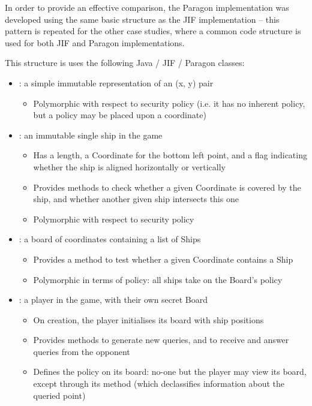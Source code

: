 In order to provide an effective comparison, the Paragon implementation was developed using the same basic structure as the JIF implementation -- this pattern is repeated for the other case studies, where a common code structure is used for both JIF and Paragon implementations.

This structure is uses the following Java / JIF / Paragon classes:

\begin{itemize}
	\item {}: a simple immutable representation of an (x, y) pair
	
	\begin{itemize}
		\item Polymorphic with respect to security policy (i.e. it has no inherent policy, but a policy may be placed upon a coordinate)
	\end{itemize}
	
	\item {}: an immutable single ship in the game
	
	\begin{itemize}
		\item Has a length, a Coordinate for the bottom left point, and a flag indicating whether the ship is aligned horizontally or vertically
		
		\item Provides methods to check whether a given Coordinate is covered by the ship, and whether another given ship intersects this one
		
		\item Polymorphic with respect to security policy
	\end{itemize}
	
	\item {}: a board of coordinates containing a list of Ships
	
	\begin{itemize}

		\item Provides a method to test whether a given Coordinate contains a Ship
		
		\item Polymorphic in terms of policy: all ships take on the Board's policy
	\end{itemize}
	
	\item {}: a player in the game, with their own secret Board
	
	\begin{itemize}
		\item On creation, the player initialises its board with ship positions
		\item Provides methods to generate new queries, and to receive and answer queries from the opponent
		\item Defines the policy on its board: no-one but the player may view its board, except through its  method (which declassifies information about the queried point)
	\end{itemize}
	

\end{itemize}
